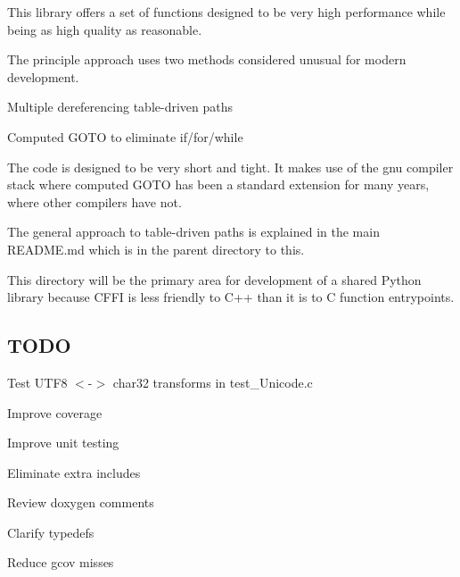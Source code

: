 This library offers a set of functions designed to be very high performance while being as high quality as reasonable.

The principle approach uses two methods considered unusual for modern development.
\begin{DoxyItemize}
\item Multiple dereferencing table-\/driven paths
\item Computed G\+O\+T\+O to eliminate if/for/while
\end{DoxyItemize}

The code is designed to be very short and tight. It makes use of the gnu compiler stack where computed G\+O\+T\+O has been a standard extension for many years, where other compilers have not.

The general approach to table-\/driven paths is explained in the main R\+E\+A\+D\+M\+E.\+md which is in the parent directory to this.

This directory will be the primary area for development of a shared Python library because C\+F\+F\+I is less friendly to C++ than it is to C function entrypoints.

\subsection*{T\+O\+D\+O}


\begin{DoxyItemize}
\item Test U\+T\+F8 $<$-\/$>$ char32 transforms in test\+\_\+\+Unicode.\+c
\item Improve coverage
\item Improve unit testing
\item Eliminate extra includes
\item Review doxygen comments
\item Clarify typedefs
\item Reduce gcov misses 
\end{DoxyItemize}